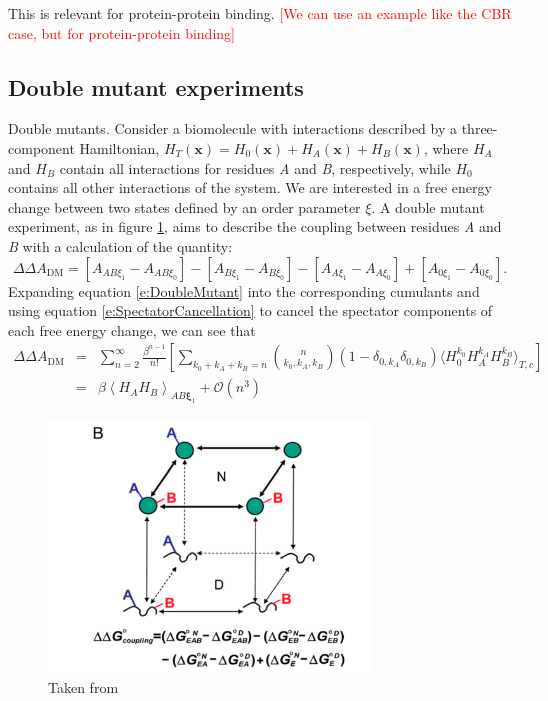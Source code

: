 \documentclass[%
 preprint,
 amsmath,amssymb,
 aps,
]{revtex4-1}
\newcommand{\warning}[1]{{\textsf{{\textcolor{red}{{[#1]}{}}}}}}
\renewcommand{\vec}[1]{{\bm{#1}}}
\begin{document}
 This is relevant for protein-protein binding.  
 \warning{We can use an example like the CBR case, but for protein-protein binding}
 
 
 
 \subsection{Double mutant experiments}
 Double mutants.  Consider a biomolecule with interactions described by a three-component Hamiltonian,
 $H_{T} \left( \vec{x} \right) = H_0 \left( \vec{x} \right) + H_A \left( \vec{x} \right) + H_B \left( \vec{x} \right)$, where $H_A$ and $H_B$ contain all interactions for residues \emph{A} and \emph{B}, respectively, while $H_0$ contains all other interactions of the system.   We are interested in a free energy change between two states defined by an order parameter $\xi$.  A double mutant experiment, as in figure \ref{f:DoubleMutant}, aims to describe the coupling between residues \emph{A} and \emph{B} with a calculation of the quantity:
 \begin{equation}
 \Delta \Delta A_{\text{DM}} =  \left[ A_{AB\xi_1} - A_{AB\xi_0} \right] - \left[ A_{B\xi_1} - A_{B\xi_0} \right]
 - \left[ A_{A\xi_1} - A_{A\xi_0} \right] + \left[ A_{0\xi_1} - A_{0\xi_0} \right]. 
 \label{e:DoubleMutant}
 \end{equation}
 Expanding equation \ref{e:DoubleMutant} into the corresponding cumulants and using equation \ref{e:SpectatorCancellation} to cancel the spectator components of each free energy change, we can see that
 \begin{eqnarray}
  \Delta \Delta A_{\text{DM}} &=& 
   \sum_{n=2}^{\infty}  \frac{\beta^{n-1}}{n!} 
\left[
 \sum_{k_0+k_A+k_B=n} 
{ n \choose k_0,k_A,k_B}  \left( 1- \delta_{0,k_A} \delta_{0,k_B} \right) \langle  H_0^{k_0} H_A^{k_A} H_B^{k_B} 
\rangle_{T,c} \right]
\nonumber \\ 
& = & 
\beta \left \langle H_A H_B \right \rangle_{AB\vec{\xi}_1} + \mathcal{O} \left( n^3 \right) 
 \label{e:DoubleMutantExpansion}
 \end{eqnarray}
 
\begin{figure}
 \centering
  \includegraphics[width=8.6cm]{doubleMutant.png}
\caption{\label{f:DoubleMutant} { Taken from \cite{Cho2014} }}
\end{figure}
\end{document}

